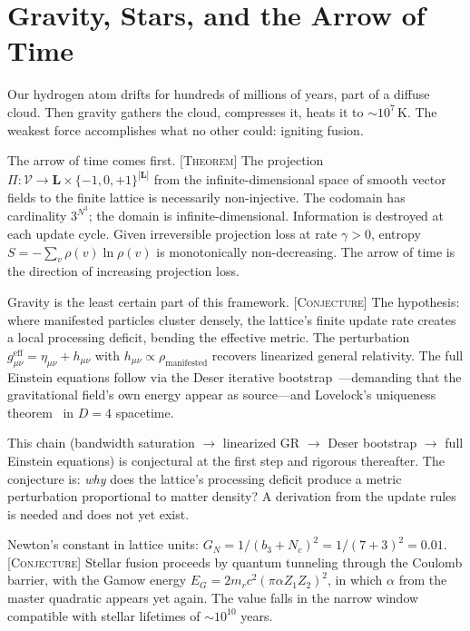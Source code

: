 \documentclass[12pt]{article}
\newcommand{\etag}[1]{{\normalfont\textsc{\footnotesize [#1]}}}
\theoremstyle{compact}
\begin{document}
\section{Gravity, Stars, and the Arrow of Time}
\label{sec:gravity}

Our hydrogen atom drifts for hundreds of millions of years, part of a diffuse cloud. Then gravity gathers the cloud, compresses it, heats it to $\sim 10^7$\,K. The weakest force accomplishes what no other could: igniting fusion.

The arrow of time comes first. \etag{Theorem} The projection $\Pi: \mathcal{V} \to \mathbf{L} \times \{-1,0,+1\}^{|\mathbf{L}|}$ from the infinite-dimensional space of smooth vector fields to the finite lattice is necessarily non-injective. The codomain has cardinality $3^{N^3}$; the domain is infinite-dimensional. Information is destroyed at each update cycle. Given irreversible projection loss at rate $\gamma > 0$, entropy $S = -\sum_v \rho(v)\ln\rho(v)$ is monotonically non-decreasing. The arrow of time is the direction of increasing projection loss.

Gravity is the least certain part of this framework. \etag{Conjecture} The hypothesis: where manifested particles cluster densely, the lattice's finite update rate creates a local processing deficit, bending the effective metric. The perturbation $g_{\mu\nu}^{\mathrm{eff}} = \eta_{\mu\nu} + h_{\mu\nu}$ with $h_{\mu\nu} \propto \rho_{\mathrm{manifested}}$ recovers linearized general relativity. The full Einstein equations follow via the Deser iterative bootstrap~\cite{deser}---demanding that the gravitational field's own energy appear as source---and Lovelock's uniqueness theorem~\cite{lovelock} in $D = 4$ spacetime.

This chain (bandwidth saturation $\to$ linearized GR $\to$ Deser bootstrap $\to$ full Einstein equations) is conjectural at the first step and rigorous thereafter. The conjecture is: \emph{why} does the lattice's processing deficit produce a metric perturbation proportional to matter density? A derivation from the update rules is needed and does not yet exist.

Newton's constant in lattice units: $G_N = 1/(b_3 + N_c)^2 = 1/(7 + 3)^2 = 0.01$. \etag{Conjecture} Stellar fusion proceeds by quantum tunneling through the Coulomb barrier, with the Gamow energy $E_G = 2m_r c^2(\pi\alpha Z_1 Z_2)^2$, in which $\alpha$ from the master quadratic appears yet again. The value falls in the narrow window compatible with stellar lifetimes of $\sim 10^{10}$ years.
\end{document}

